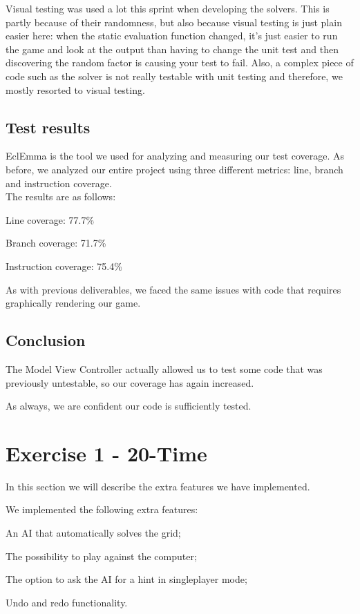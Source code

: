\documentclass[a4paper,11pt,report]{scrartcl}
\begin{document}
Visual testing was used a lot this sprint when developing the solvers. This is
partly because of their randomness, but also because visual testing is just
plain easier here: when the static evaluation function changed, it's just easier
to run the game and look at the output than having to change the unit test and
then discovering the random factor is causing your test to fail. Also, a complex
piece of code such as the solver is not really testable with unit testing and
therefore, we mostly resorted to visual testing.

\subsection{Test results}
EclEmma is the tool we used for analyzing and measuring our test coverage.
As before, we analyzed our entire project using three different metrics: line,
branch and instruction coverage.\\

The results are as follows:
\begin{description}
	\item Line coverage: 77.7\%
	\item Branch coverage: 71.7\%
	\item Instruction coverage: 75.4\%
\end{description}
As with previous deliverables, we faced the same issues with code that requires
graphically rendering our game. 

\subsection{Conclusion}
The Model View Controller actually allowed us to test some code that was
previously untestable, so our coverage has again increased.

As always, we are confident our code is sufficiently tested.

\newpage\section{Exercise 1 - 20-Time}
In this section we will describe the extra features we have implemented.

We implemented the following extra features:
\begin{description}
	\item An AI that automatically solves the grid;
	\item The possibility to play against the computer;
	\item The option to ask the AI for a hint in singleplayer mode;
	\item Undo and redo functionality.
\end{description}
\end{document}
